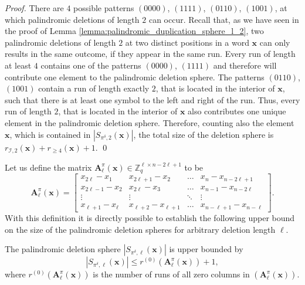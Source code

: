 \documentclass[a4paper]{llncs}
\newcommand{\ve}[1]{\boldsymbol{#1}}
\begin{document}
	\begin{proof}
		There are $4$ possible patterns $(0000)$, $(1111)$, $(0110)$, $(1001)$, at which palindromic deletions of length $2$ can occur. Recall that, as we have seen in the proof of Lemma \ref{lemma:palindromic_duplication_sphere_l_2}, two palindromic deletions of length $2$ at two distinct positions in a word $\ve{x}$ can only results in the same outcome, if they appear in the same run. Every run of length at least $4$ contains one of the patterns $(0000)$, $(1111)$ and therefore will contribute one element to the palindromic deletion sphere. The patterns $(0110)$, $(1001)$ contain a run of length exactly $2$, that is located in the interior of $\ve{x}$, such that there is at least one symbol to the left and right of the run. Thus, every run of length $2$, that is located in the interior of $\ve{x}$ also contributes one unique element in the palindromic deletion sphere. Therefore, counting also the element $\ve{x}$, which is contained in $|S_{\pi^\delta, 2}(\ve{x})|$, the total size of the deletion sphere is $r_{\mathcal{I},2}(\ve{x}) + r_{\geq4}(\ve{x})+1$.  \qed
		
	\end{proof}
	Let us define the matrix $\ve{A}^\pi_\ell(\ve{x}) \in \mathbb{Z}_q^{\ell\times n-2\ell+1}$ to be
	\begin{equation}
	\ve{A}^\pi_\ell(\ve{x}) = \begin{bmatrix}
	x_{2\ell}-x_1 & x_{2\ell+1}-x_2 & \dots & x_n-x_{n-2\ell+1} \\
	x_{2\ell-1}-x_2 & x_{2\ell}-x_3 & \dots & x_{n-1}-x_{n-2\ell} \\
	\vdots & \vdots &\ddots & \vdots \\
	x_{\ell+1}-x_\ell & x_{\ell+2}-x_{\ell+1} & \dots & x_{n-\ell+1}-x_{n-\ell}
	\end{bmatrix}.
	\end{equation}
	With this definition it is directly possible to establish the following upper bound on the size of the palindromic deletion spheres for arbitrary deletion length $\ell$.
	\begin{lemma} \label{lemma:upper_bound_deletion_sphere}
		The palindromic deletion sphere $|S_{\pi^\delta, \ell}(\ve{x})|$ is upper bounded by
		\begin{equation*}
		|S_{\pi^\delta, \ell}(\ve{x})| \leq r^{(0)} \left(\ve{A}^\pi_\ell(\ve{x})\right)+1,
		\end{equation*}
		where $r^{(0)} \left(\ve{A}^\pi_\ell(\ve{x})\right)$ is the number of runs of all zero columns in $\left(\ve{A}^\pi_\ell(\ve{x})\right)$.
	\end{lemma}
\end{document}

